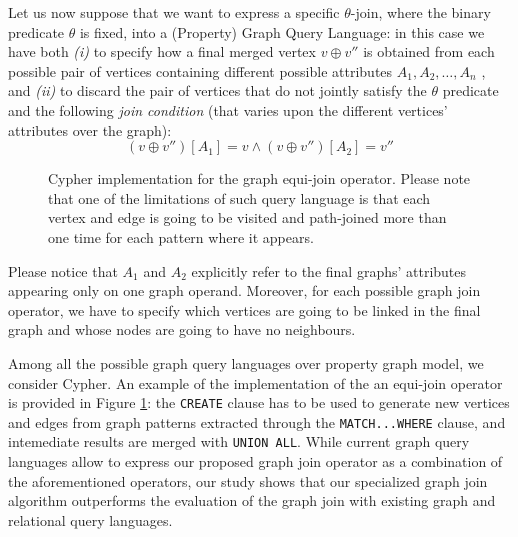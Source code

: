 \begin{description}
	Let us now suppose that we want to express a specific $\theta$-join, where the binary predicate $\theta$
	is fixed, into a (Property) Graph Query Language:
	in this case we have both \textit{(i)} to specify how a final merged vertex $v\oplus v''$ is obtained from each
	possible pair of vertices containing different possible attributes $A_1,A_2,\dots,A_n$ , and \textit{(ii)} to discard
	the pair of vertices that do not jointly satisfy  the
	$\theta$ predicate and the following \textit{join condition} (that varies upon the different vertices'
	attributes over the graph):
	\[(v\oplus v'')[A_1]=v\wedge  (v\oplus v'')[A_2]=v''\]

	\begin{figure}[!p]
	    \begin{minipage}[t]{\textwidth}
	      
	      \caption{Cypher implementation for the graph equi-join operator. Please note that one of the limitations of such query language is that each vertex and edge is going to be visited and path-joined more than one time for each pattern where it appears.}
	      \label{fig:CypherEquiJoin}
	    \end{minipage}
	\end{figure}
	Please notice that $A_1$ and $A_2$ explicitly refer to the final graphs' attributes appearing only on one graph operand.
	Moreover, for each possible graph join operator, we have to specify which vertices are going to be
	linked in the final graph and whose nodes are going to have no neighbours. 
	
	Among all the possible graph query languages over property graph model, we consider Cypher. An example of the implementation of the an equi-join operator is provided in Figure \ref{fig:CypherEquiJoin}: the
	\texttt{CREATE} clause has to be used to generate new vertices and edges from graph patterns
	extracted through the \texttt{MATCH...WHERE} clause, and intemediate results are merged with
	\texttt{UNION ALL}.
	While current graph query languages allow to express our proposed graph
	join operator as a combination of the aforementioned operators,  our study shows that our specialized graph join
	algorithm outperforms the evaluation of the graph join with existing graph and relational query languages.
	\medskip


\end{description}
